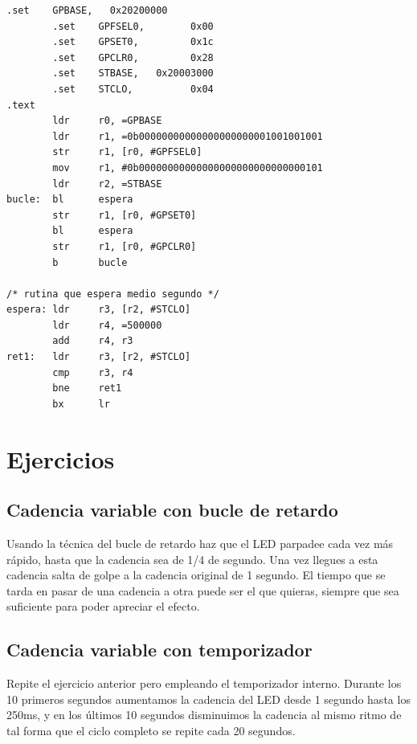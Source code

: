 \begin{lstlisting}[caption={esbn5.s},label={lst:codigoPract4_5}]
        .set    GPBASE,   0x20200000
        .set    GPFSEL0,        0x00
        .set    GPSET0,         0x1c
        .set    GPCLR0,         0x28
        .set    STBASE,   0x20003000
        .set    STCLO,          0x04
.text
        ldr     r0, =GPBASE
        ldr     r1, =0b00000000000000000000001001001001
        str     r1, [r0, #GPFSEL0]
        mov     r1, #0b00000000000000000000000000000101
        ldr     r2, =STBASE
bucle:  bl      espera
        str     r1, [r0, #GPSET0]
        bl      espera
        str     r1, [r0, #GPCLR0]
        b       bucle

/* rutina que espera medio segundo */
espera: ldr     r3, [r2, #STCLO]
        ldr     r4, =500000
        add     r4, r3
ret1:   ldr     r3, [r2, #STCLO]
        cmp     r3, r4
        bne     ret1
        bx      lr
\end{lstlisting}

\section{Ejercicios}

\subsection{Cadencia variable con bucle de retardo}

Usando la técnica del bucle de retardo haz que el LED parpadee
cada vez más rápido, hasta que la cadencia sea de 1/4 de segundo.
Una vez llegues a esta cadencia salta de golpe a la cadencia
original de 1 segundo. El tiempo que se tarda en pasar de una
cadencia a otra puede ser el que quieras, siempre que sea
suficiente para poder apreciar el efecto.

\subsection{Cadencia variable con temporizador}

Repite el ejercicio anterior pero empleando el temporizador
interno. Durante los 10 primeros segundos aumentamos la cadencia
del LED desde 1 segundo hasta los 250ms, y en los últimos 10
segundos disminuimos la cadencia al mismo ritmo de tal forma
que el ciclo completo se repite cada 20 segundos.

\chapterend{}

%